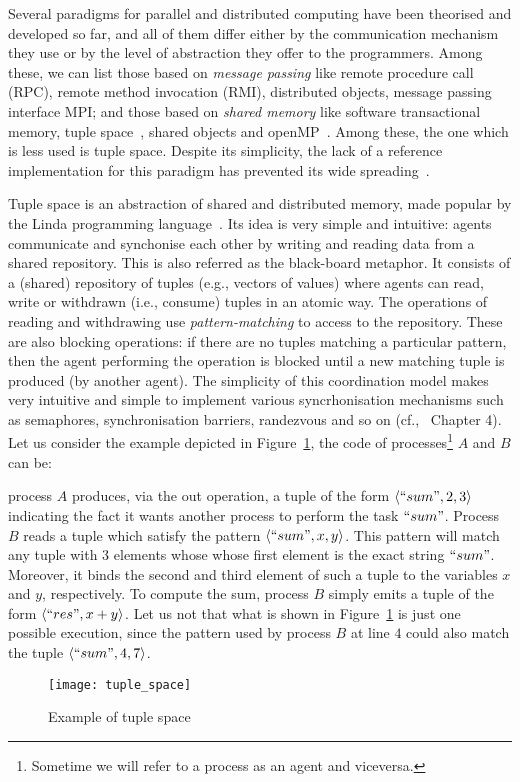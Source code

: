 
Several paradigms for parallel and distributed computing have been theorised and developed so far, and all of them differ either by the communication mechanism they use or by the level of abstraction they offer to the programmers. Among these, we can list those based on \emph{message passing} like remote procedure call (RPC), remote method invocation (RMI), distributed objects, message passing interface MPI; and those based on \emph{shared memory} like software transactional memory, tuple space~\cite{Gelernter85}, shared objects and  openMP~\cite{Mattson03}. Among these, the one which is less used is tuple space. Despite its simplicity, the lack of a reference implementation for this paradigm has prevented its wide spreading~\cite{BuravlevNM18}.


Tuple space is an abstraction of shared and distributed memory, made popular by the Linda programming language~\cite{Gelernter85}. Its idea is very simple and intuitive: agents communicate and synchonise each other by writing and reading data from a shared repository. This is also referred as the black-board metaphor. 
It consists of a (shared) repository of tuples (e.g., vectors of values) where agents can read, write or withdrawn (i.e., consume) tuples in an atomic way. 
The operations of reading and withdrawing use  \emph{pattern-matching} to access to the repository.
 These are also blocking operations:  if there are no tuples matching a particular pattern, then the agent performing the operation is blocked until a new matching tuple is produced (by another agent). The simplicity of this coordination model makes very intuitive and simple to implement various syncrhonisation mechanisms such as semaphores, synchronisation barriers, randezvous and so on (cf.,~\cite{Doberkat00b} Chapter 4). Let us consider the example depicted in Figure~\ref{fig:example}, the code of processes\footnote{Sometime we will refer to a process as an agent and viceversa.} $A$ and $B$ can be: 
 
 \noindent process $A$ produces, via the out operation, a tuple of the form $\langle ``sum",2,3 \rangle$ indicating the fact it wants
 another process to perform the task $``sum"$. Process $B$ reads a tuple which satisfy the pattern $\langle ``sum",x,y \rangle$. This pattern will match any tuple with 3 elements whose
  whose first element is the exact string
 $``sum"$. Moreover, it  binds the second and third element of such a tuple to the variables $x$ and $y$, respectively. To compute the sum, process $B$ simply emits a tuple of the form $\langle ``res",x+y \rangle$. Let us not that what is shown in Figure~\ref{fig:example} is just one possible execution, since the pattern used by process $B$ at line
 $4$ could also match the tuple $\langle ``sum",4,7 \rangle$.
 
 \begin{figure}
\centering
 	\texttt{[image: tuple\_space]}
	\label{fig:example}
	\caption{Example of tuple space}
 \end{figure}